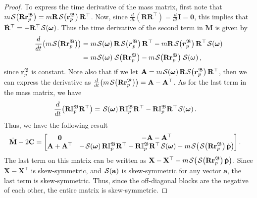 \begin{proof}
    To express the time derivative of the mass matrix, first note that $m\SL[\mathbf{R}\mathbf{r}_p^\mathfrak{B}] = m\mathbf{R}\SL[\mathbf{r}_p^\mathfrak{B}]\mathbf{R}^\top$. Now, since $\frac{d}{dt}(\mathbf{R}\mathbf{R}^\top)=\frac{d}{dt}\mathbf{I}=\mathbf{0}$, this implies that $\dot{\mathbf{R}}^\top = -\mathbf{R}^\top\SL[\boldsymbol{\omega}]$. Thus the time derivative of the second term in $\mathbf{M}$ is given by
    \begin{align}
        \frac{d}{dt}\bigl(m\SL[\mathbf{R}\mathbf{r}_p^\mathfrak{B}]\bigr) &=
        m\SL[\boldsymbol{\omega}]\mathbf{R}\SL[\boldsymbol{r}_p^\mathfrak{B}]\mathbf{R}^\top - m\mathbf{R}\SL[\boldsymbol{r}_p^\mathfrak{B}]\mathbf{R}^\top\SL[\boldsymbol{\omega}]\\
        &= m\SL[\boldsymbol{\omega}]\SL[\mathbf{R}\mathbf{r}_p^\mathfrak{B}] - m\SL[\mathbf{R}\mathbf{r}_p^\mathfrak{B}]\SL[\boldsymbol{\omega}],
    \end{align}
    since $\mathbf{r}_p^\mathfrak{B}$ is constant. Note also that if we let $\mathbf{A} = m\SL[\boldsymbol{\omega}]\mathbf{R}\SL[\boldsymbol{r}_p^\mathfrak{B}]\mathbf{R}^\top$, then we can express the derivative as $\frac{d}{dt}\bigl(m\SL[\mathbf{R}\mathbf{r}_p^\mathfrak{B}]\bigr) = \mathbf{A} - \mathbf{A}^\top$. As for the last term in the mass matrix, we have
    \begin{align}
        \frac{d}{dt}\bigl(\mathbf{R}\mathbb{I}_p^\mathfrak{B}\mathbf{R}^\top\bigr) &=
        \SL[\boldsymbol{\omega}]\mathbf{R}\mathbb{I}_p^\mathfrak{B}\mathbf{R}^\top - \mathbf{R}\mathbb{I}_p^\mathfrak{B}\mathbf{R}^\top\SL[\boldsymbol{\omega}].
    \end{align}
    Thus, we have the following result
    \begin{align}
        \dot{\mathbf{M}} - 2\mathbf{C} &= \begin{bmatrix}
            \mathbf{0} &- \mathbf{A} - \mathbf{A}^\top\\
            \mathbf{A} + \mathbf{A}^\top & -\SL[\boldsymbol{\omega}]\mathbf{R}\mathbb{I}_p^\mathfrak{B}\mathbf{R}^\top - \mathbf{R}\mathbb{I}_p^\mathfrak{B}\mathbf{R}^\top\SL[\boldsymbol{\omega}] -m\SL[\SL[\mathbf {R}\mathbf {r}_p^\mathfrak{B}] \dot{\mathbf{p}}]
        \end{bmatrix}.
    \end{align}
    The last term on this matrix can be written as $\mathbf{X} - \mathbf{X}^\top -m\SL[\SL[\mathbf {R}\mathbf {r}_p^\mathfrak{B}] \dot{\mathbf{p}}]$. Since $\mathbf{X} - \mathbf{X}^\top$ is skew-symmetric, and $\SL[\mathbf{a}]$ is skew-symmetric for any vector $\mathbf{a}$, the last term is skew-symmetric. Thus, since the off-diagonal blocks are the negative of each other, the entire matrix is skew-symmetric.
\end{proof}

